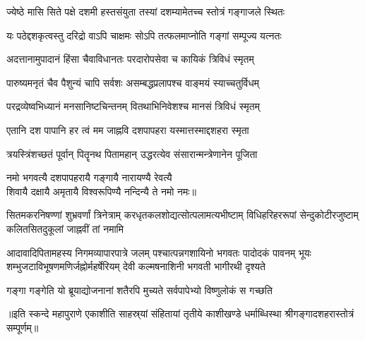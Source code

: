\twolineshloka
{ज्येष्ठे मासि सिते पक्षे दशमी हस्तसंयुता}%
{तस्यां दशम्यामेतच्च स्तोत्रं गङ्गाजले स्थितः}

\twolineshloka
{यः पठेद्दशकृत्वस्तु दरिद्रो वाऽपि चाक्षमः}%
{सोऽपि तत्फलमाप्नोति गङ्गां सम्पूज्य यत्नतः}

\twolineshloka
{अदत्तानामुपादानं हिंसा चैवाविधानतः}%
{परदारोपसेवा च कायिकं त्रिविधं स्मृतम्}

\twolineshloka
{पारुष्यमनृतं चैव पैशुन्यं चापि सर्वशः}%
{असम्बद्धप्रलापश्च वाङ्मयं स्याच्चतुर्विधम्}

\twolineshloka
{परद्रव्येष्वभिध्यानं मनसानिष्टचिन्तनम्}%
{वितथाभिनिवेशश्च मानसं त्रिविधं स्मृतम्}

\twolineshloka
{एतानि दश पापानि हर त्वं मम जाह्नवि}%
{दशपापहरा यस्मात्तस्माद्दशहरा स्मृता}

\twolineshloka  
{त्रयस्त्रिंशच्छतं पूर्वान् पितॄनथ पितामहान्}%
{उद्धरत्येव संसारान्मन्त्रेणानेन पूजिता}%


{नमो भगवत्यै दशपापहरायै गङ्गायै नारायण्यै रेवत्यै}\\
{शिवायै दक्षायै अमृतायै विश्वरूपिण्यै नन्दिन्यै ते नमो नमः॥}%

\fourlineindentedshloka
{सितमकरनिषण्णां शुभ्रवर्णां त्रिनेत्राम्}
{करधृतकलशोद्यत्सोत्पलामत्यभीष्टाम्}%
{विधिहरिहररूपां सेन्दुकोटीरजुष्टाम्}
{कलितसितदुकूलां जाह्नवीं तां नमामि}%

\fourlineindentedshloka
{आदावादिपितामहस्य निगमव्यापारपात्रे जलम्}
        {पश्चात्पन्नगशायिनो भगवतः पादोदकं पावनम्} 
{भूयः शम्भुजटाविभूषणमणिर्जह्नोर्महर्षेरियम्}
        {देवी कल्मषनाशिनी भगवती भागीरथी दृश्यते}  %

\twolineshloka  
{गङ्गा गङ्गेति यो ब्रूयाद्योजनानां शतैरपि}
{मुच्यते सर्वपापेभ्यो विष्णुलोकं स गच्छति}%

॥इति स्कन्दे महापुराणे एकाशीति साहस्र्यां संहितायां तृतीये काशीखण्डे
धर्माब्धिस्था श्रीगङ्गादशहरास्तोत्रं सम्पूर्णम्॥